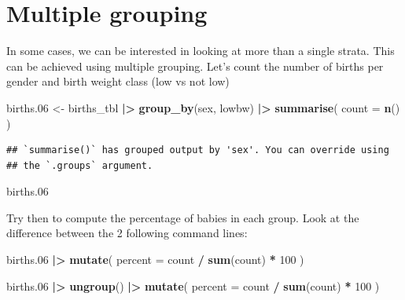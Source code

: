 \documentclass[
]{book}
\newenvironment{Shaded}{\begin{snugshade}}{\end{snugshade}}
\newcommand{\AttributeTok}[1]{\textcolor[rgb]{0.13,0.29,0.53}{#1}}
\newcommand{\DecValTok}[1]{\textcolor[rgb]{0.00,0.00,0.81}{#1}}
\newcommand{\FloatTok}[1]{\textcolor[rgb]{0.00,0.00,0.81}{#1}}
\newcommand{\FunctionTok}[1]{\textcolor[rgb]{0.13,0.29,0.53}{\textbf{#1}}}
\newcommand{\NormalTok}[1]{#1}
\newcommand{\OtherTok}[1]{\textcolor[rgb]{0.56,0.35,0.01}{#1}}
\newcommand{\SpecialCharTok}[1]{\textcolor[rgb]{0.81,0.36,0.00}{\textbf{#1}}}
\begin{document}
\section{Multiple grouping}\label{multiple-grouping}

In some cases, we can be interested in looking at more than a single strata. This can be achieved using multiple grouping.
Let's count the number of births per gender and birth weight class (low vs not low)

\begin{Shaded}
\begin{Highlighting}[]
\NormalTok{births}\FloatTok{.06} \OtherTok{\textless{}{-}}
\NormalTok{  births\_tbl }\SpecialCharTok{|\textgreater{}}
  \FunctionTok{group\_by}\NormalTok{(sex, lowbw) }\SpecialCharTok{|\textgreater{}}
  \FunctionTok{summarise}\NormalTok{(}
    \AttributeTok{count =} \FunctionTok{n}\NormalTok{()}
\NormalTok{  )}
\end{Highlighting}
\end{Shaded}

\begin{verbatim}
## `summarise()` has grouped output by 'sex'. You can override using
## the `.groups` argument.
\end{verbatim}

\begin{Shaded}
\begin{Highlighting}[]
\NormalTok{births}\FloatTok{.06}
\end{Highlighting}
\end{Shaded}

Try then to compute the percentage of babies in each group.
Look at the difference between the 2 following command lines:

\begin{Shaded}
\begin{Highlighting}[]
\NormalTok{births}\FloatTok{.06} \SpecialCharTok{|\textgreater{}}
  \FunctionTok{mutate}\NormalTok{(}
    \AttributeTok{percent =}\NormalTok{ count }\SpecialCharTok{/} \FunctionTok{sum}\NormalTok{(count) }\SpecialCharTok{*} \DecValTok{100}
\NormalTok{  )}

\NormalTok{births}\FloatTok{.06} \SpecialCharTok{|\textgreater{}}
  \FunctionTok{ungroup}\NormalTok{() }\SpecialCharTok{|\textgreater{}}
  \FunctionTok{mutate}\NormalTok{(}
    \AttributeTok{percent =}\NormalTok{ count }\SpecialCharTok{/} \FunctionTok{sum}\NormalTok{(count) }\SpecialCharTok{*} \DecValTok{100}
\NormalTok{  )}
\end{Highlighting}
\end{Shaded}
\end{document}
